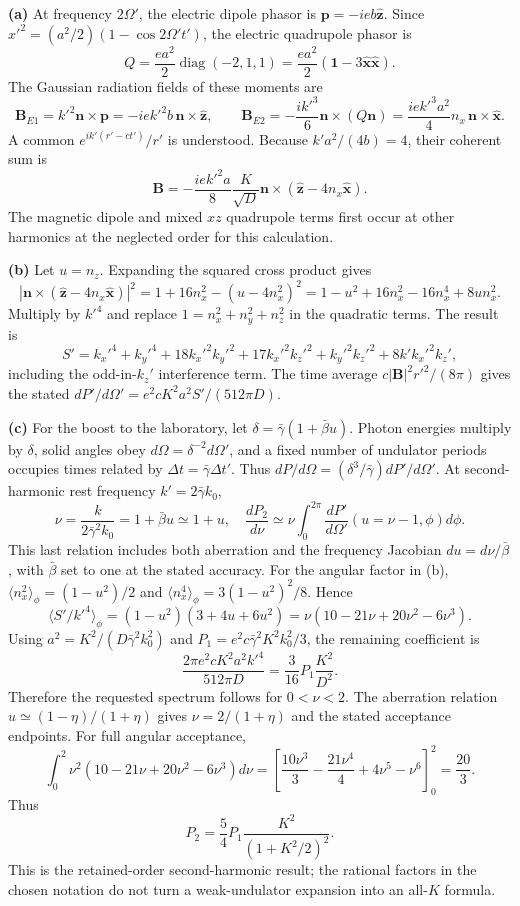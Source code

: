 \textbf{(a)} At frequency $2\Omega'$, the electric dipole phasor is
$\mathbf p=-ieb\hat{\mathbf z}$. Since
$x'^2=(a^2/2)(1-\cos2\Omega't')$, the electric quadrupole phasor is
\[
Q=\frac{ea^2}{2}\operatorname{diag}(-2,1,1)
=\frac{ea^2}{2}(\mathbf1-3\hat{\mathbf x}\hat{\mathbf x}).
\]
The Gaussian radiation fields of these moments are
\[
\mathbf B_{E1}=k'^2\mathbf n\times\mathbf p
=-iek'^2b\,\mathbf n\times\hat{\mathbf z},\qquad
\mathbf B_{E2}=-\frac{ik'^3}{6}\mathbf n\times(Q\mathbf n)
=\frac{iek'^3a^2}{4}n_x\,\mathbf n\times\hat{\mathbf x}.
\]
A common $e^{ik'(r'-ct')}/r'$ is understood.
Because $k'a^2/(4b)=4$, their coherent sum is
\[
\boxed{\mathbf B=-\frac{iek'^2a}{8}\frac K{\sqrt D}
\mathbf n\times(\hat{\mathbf z}-4n_x\hat{\mathbf x}).}
\]
The magnetic dipole and mixed $xz$ quadrupole terms first occur at
other harmonics at the neglected order for this calculation.

\textbf{(b)} Let $u=n_z$. Expanding the squared cross product gives
\[
|\mathbf n\times(\hat{\mathbf z}-4n_x\hat{\mathbf x})|^2
=1+16n_x^2-(u-4n_x^2)^2
=1-u^2+16n_x^2-16n_x^4+8un_x^2.
\]
Multiply by $k'^4$ and replace $1=n_x^2+n_y^2+n_z^2$ in the quadratic
terms. The result is
\[
S'=k_x'^4+k_y'^4+18k_x'^2k_y'^2
+17k_x'^2k_z'^2+k_y'^2k_z'^2+8k'k_x'^2k_z',
\]
including the odd-in-$k_z'$ interference term.
The time average $c|\mathbf B|^2r'^2/(8\pi)$ gives the stated
$dP'/d\Omega'=e^2cK^2a^2S'/(512\pi D)$.

\textbf{(c)} For the boost to the laboratory, let
$\delta=\bar\gamma(1+\bar\beta u)$. Photon energies multiply by
$\delta$, solid angles obey $d\Omega=\delta^{-2}d\Omega'$, and a fixed
number of undulator periods occupies times related by
$\Delta t=\bar\gamma\Delta t'$.
Thus $dP/d\Omega=(\delta^3/\bar\gamma)dP'/d\Omega'$.
At second-harmonic rest frequency $k'=2\bar\gamma k_0$,
\[
\nu=\frac{k}{2\bar\gamma^2k_0}=1+\bar\beta u\simeq1+u,
\quad
\frac{dP_2}{d\nu}\simeq\nu\int_0^{2\pi}
\frac{dP'}{d\Omega'}(u=\nu-1,\phi)d\phi.
\]
This last relation includes both aberration and the frequency Jacobian
$du=d\nu/\bar\beta$, with $\bar\beta$ set to one at the stated accuracy.
For the angular factor in (b),
$\langle n_x^2\rangle_\phi=(1-u^2)/2$ and
$\langle n_x^4\rangle_\phi=3(1-u^2)^2/8$. Hence
\[
\langle S'/k'^4\rangle_\phi
=(1-u^2)(3+4u+6u^2)
=\nu(10-21\nu+20\nu^2-6\nu^3).
\]
Using $a^2=K^2/(D\bar\gamma^2k_0^2)$ and
$P_1=e^2c\bar\gamma^2K^2k_0^2/3$, the remaining coefficient is
\[
\frac{2\pi e^2cK^2a^2k'^4}{512\pi D}
=\frac3{16}P_1\frac{K^2}{D^2}.
\]
Therefore the requested spectrum follows for $0<\nu<2$.
The aberration relation $u\simeq(1-\eta)/(1+\eta)$ gives
$\nu=2/(1+\eta)$ and the stated acceptance endpoints.
For full angular acceptance,
\[
\int_0^2\nu^2(10-21\nu+20\nu^2-6\nu^3)d\nu
=\left[\frac{10\nu^3}{3}-\frac{21\nu^4}{4}
+4\nu^5-\nu^6\right]_0^2=\frac{20}{3}.
\]
Thus
\[
\boxed{P_2=\frac54P_1\frac{K^2}{(1+K^2/2)^2}.}
\]
This is the retained-order second-harmonic result; the rational factors
in the chosen notation do not turn a weak-undulator expansion into an
all-$K$ formula.
